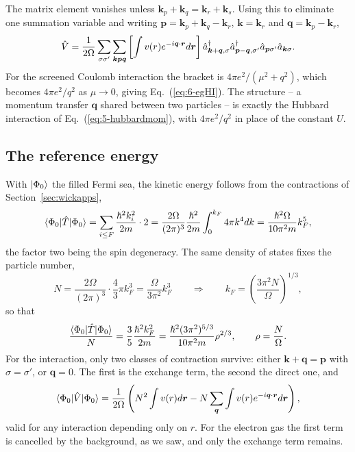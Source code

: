 The matrix element vanishes unless
$\bm{k}_p+\bm{k}_q=\bm{k}_r+\bm{k}_s$.  Using this to eliminate one summation
variable and writing $\bm{p}=\bm{k}_p+\bm{k}_q-\bm{k}_r$,
$\bm{k}=\bm{k}_r$ and $\bm{q}=\bm{k}_p-\bm{k}_r$,
\begin{equation}
  \hat{V} = \frac{1}{2\Omega}\sum_{\sigma\sigma'}
    \sum_{\bm{k}\bm{p}\bm{q}}
    \left[\int v(r)e^{-i\bm{q}\cdot\bm{r}}d\bm{r}\right]
    \hat{a}^{\dagger}_{\bm{k}+\bm{q},\sigma}
    \hat{a}^{\dagger}_{\bm{p}-\bm{q},\sigma'}
    \hat{a}_{\bm{p}\sigma'}\hat{a}_{\bm{k}\sigma}.
  \label{eq:6-Vmomentum}
\end{equation}
For the screened Coulomb interaction the bracket is
$4\pi e^2/(\mu^2+q^2)$, which becomes $4\pi e^2/q^2$ as $\mu\to0$, giving
Eq.~(\ref{eq:6-egHI}).  The structure -- a momentum transfer $\bm{q}$ shared
between two particles -- is exactly the Hubbard interaction of
Eq.~(\ref{eq:5-hubbardmom}), with $4\pi e^2/q^2$ in place of the constant $U$.

\subsection{The reference energy}
\label{sec:egreference}

With $\vert \Phi_0 \rangle$ the filled Fermi sea, the kinetic energy follows from the
contractions of Section~\ref{sec:wickapps},
\begin{equation}
  \langle \Phi_0 | \hat{T} | \Phi_0 \rangle
   = \sum_{i\le F}\frac{\hslash^2k_i^2}{2m}\cdot 2
   = \frac{2\Omega}{(2\pi)^3}\frac{\hslash^2}{2m}
     \int_0^{k_F}4\pi k^4dk
   = \frac{\hslash^2\Omega}{10\pi^2 m}k_F^5,
  \label{eq:6-egkinetic}
\end{equation}
the factor two being the spin degeneracy.  The same density of states fixes
the particle number,
\begin{equation}
  N = \frac{2\Omega}{(2\pi)^3}\cdot\frac{4}{3}\pi k_F^3
    = \frac{\Omega}{3\pi^2}k_F^3
  \qquad\Longrightarrow\qquad
  k_F = \left(\frac{3\pi^2N}{\Omega}\right)^{1/3},
  \label{eq:6-kF}
\end{equation}
so that
\begin{equation}
  \frac{\langle \Phi_0 | \hat{T} | \Phi_0 \rangle}{N}
   = \frac{3}{5}\frac{\hslash^2k_F^2}{2m}
   = \frac{\hslash^2(3\pi^2)^{5/3}}{10\pi^2 m}\rho^{2/3},
  \qquad \rho = \frac{N}{\Omega}.
  \label{eq:6-egkineticdensity}
\end{equation}
For the interaction, only two classes of contraction survive: either
$\bm{k}+\bm{q}=\bm{p}$ with $\sigma=\sigma'$, or $\bm{q}=0$.  The first is the
exchange term, the second the direct one, and
\begin{equation}
  \langle \Phi_0 | \hat{V} | \Phi_0 \rangle
   = \frac{1}{2\Omega}\left(N^2\int v(r)d\bm{r}
     - N\sum_{\bm{q}}\int v(r)e^{-i\bm{q}\cdot\bm{r}}d\bm{r}\right),
  \label{eq:6-egpotential}
\end{equation}
valid for any interaction depending only on $r$.  For the electron gas the
first term is cancelled by the background, as we saw, and only the exchange
term remains.

